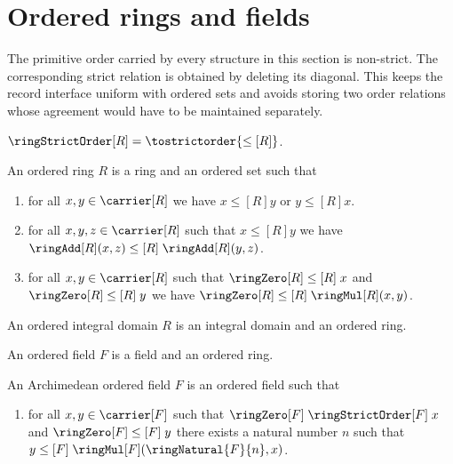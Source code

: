 



\section{Ordered rings and fields}

The primitive order carried by every structure in this section is non-strict.
The corresponding strict relation is obtained by deleting its diagonal.  This
keeps the record interface uniform with ordered sets and avoids storing two
order relations whose agreement would have to be maintained separately.

\begin{definition}\label{ordered_algebra_strict_relation}
    $\ringStrictOrder[R]=\tostrictorder{\leq[R]}$.
\end{definition}

\begin{struct}\label{ordered_ring}
    An ordered ring $R$ is a ring and an ordered set such that
    \begin{enumerate}
        \item\label{ordered_ring_total}
            for all $x,y\in\carrier[R]$ we have
                $x\mathrel{\leq[R]}y$ or $y\mathrel{\leq[R]}x$.
        \item\label{ordered_ring_add_mono}
            for all $x,y,z\in\carrier[R]$ such that
                $x\mathrel{\leq[R]}y$ we have
                $\ringAdd[R](x,z)
                    \mathrel{\leq[R]}\ringAdd[R](y,z)$.
        \item\label{ordered_ring_mul_nonnegative}
            for all $x,y\in\carrier[R]$ such that
                $\ringZero[R]\mathrel{\leq[R]}x$ and
                $\ringZero[R]\mathrel{\leq[R]}y$ we have
                $\ringZero[R]\mathrel{\leq[R]}\ringMul[R](x,y)$.
    \end{enumerate}
\end{struct}

\begin{struct}\label{ordered_integral_domain}
    An ordered integral domain $R$ is an integral domain and an ordered ring.
\end{struct}

\begin{struct}\label{ordered_field}
    An ordered field $F$ is a field and an ordered ring.
\end{struct}

\begin{struct}\label{archimedean_ordered_field}
    An Archimedean ordered field $F$ is an ordered field such that
    \begin{enumerate}
        \item\label{archimedean_ordered_field_law}
            for all $x,y\in\carrier[F]$ such that
                $\ringZero[F]\mathrel{\ringStrictOrder[F]}x$ and
                $\ringZero[F]\mathrel{\leq[F]}y$
            there exists a natural number $n$ such that
                $y\mathrel{\leq[F]}
                    \ringMul[F](\ringNatural{F}{n},x)$.
    \end{enumerate}
\end{struct}


